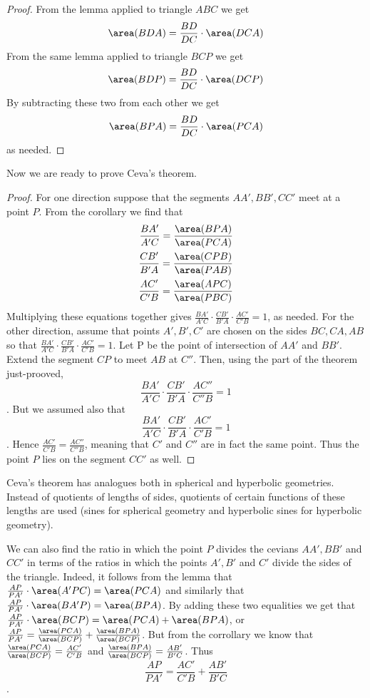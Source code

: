 \begin{proof}
From the lemma applied to triangle $ABC$ we get $$\area(BDA)=\frac{BD}{DC}\cdot\area(DCA)$$ From the same lemma applied to triangle $BCP$ we get $$\area(BDP)=\frac{BD}{DC}\cdot\area(DCP)$$ By subtracting these two from each other we get $$\area(BPA)=\frac{BD}{DC}\cdot \area(PCA)$$ as needed.
\end{proof}
Now we are ready to prove Ceva's theorem.
\begin{proof}
For one direction suppose that the segments $AA',BB',CC'$ meet at a point $P$. From the corollary we find that
\begin{align*}
\frac{BA'}{A'C}=\frac{\area(BPA)}{\area(PCA)} \\
\frac{CB'}{B'A}=\frac{\area(CPB)}{\area(PAB)} \\
\frac{AC'}{C'B}=\frac{\area(APC)}{\area(PBC)}
\end{align*}
Multiplying these equations together gives $\frac{BA'}{A'C}\cdot\frac{CB'}{B'A}\cdot\frac{AC'}{C'B}=1$, as needed.
For the other direction, assume that points $A',B',C'$ are chosen on the sides $BC,CA,AB$ so that $\frac{BA'}{A'C}\cdot\frac{CB'}{B'A}\cdot\frac{AC'}{C'B}=1$. Let P be the point of intersection of $AA'$ and $BB'$. Extend the segment $CP$ to meet $AB$ at $C''$. Then, using the part of the theorem just-prooved, $$\frac{BA'}{A'C}\cdot\frac{CB'}{B'A}\cdot\frac{AC''}{C''B}=1$$. But we assumed also that $$\frac{BA'}{A'C}\cdot\frac{CB'}{B'A}\cdot\frac{AC'}{C'B}=1$$. Hence $\frac{AC'}{C'B}=\frac{AC''}{C''B}$, meaning that $C'$ and $C''$ are in fact the same point. Thus the point $P$ lies on the segment $CC'$ as well.
\end{proof}
\begin{remark}
Ceva's theorem has analogues both in spherical and hyperbolic geometries. Instead of quotients of lengths of sides, quotients of certain functions of these lengths are used (sines for spherical geometry and hyperbolic sines for hyperbolic geometry).
\end{remark}
We can also find the ratio in which the point $P$ divides the cevians $AA',BB'$ and $CC'$ in terms of the ratios in which the points $A',B'$ and $C'$ divide the sides of the triangle. Indeed, it follows from the lemma that $\frac{AP}{PA'}\cdot\area(A'PC)=\area(PCA)$ and similarly that $\frac{AP}{PA'}\cdot\area(BA'P)=\area(BPA)$. By adding these two equalities we get that $\frac{AP}{PA'}\cdot\area(BCP)=\area(PCA)+\area(BPA)$, or $\frac{AP}{PA'}=\frac{\area(PCA)}{\area(BCP)}+\frac{\area(BPA)}{\area(BCP)}$. But from the corrollary we know that $\frac{\area(PCA)}{\area(BCP)}=\frac{AC'}{C'B}$ and $\frac{\area(BPA)}{\area(BCP)}=\frac{AB'}{B'C}$. Thus $$\frac{AP}{PA'}=\frac{AC'}{C'B}+\frac{AB'}{B'C}$$.

